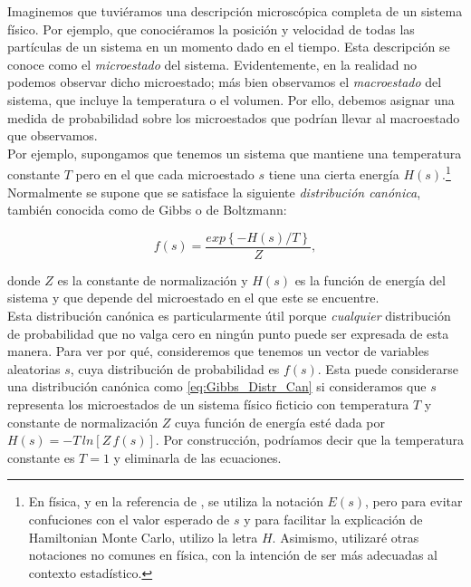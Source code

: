  Imaginemos que tuviéramos una descripción microscópica completa de un sistema físico. Por ejemplo, que conociéramos la posición y velocidad de todas las partículas de un sistema en un momento dado en el tiempo. Esta descripción se conoce como el \textit{microestado} del sistema. Evidentemente, en la realidad no podemos observar dicho microestado; más bien observamos el \textit{macroestado} del sistema, que incluye la temperatura o el volumen. Por ello, debemos asignar una medida de probabilidad sobre los microestados que podrían llevar al macroestado que observamos.\\ 
 
 Por ejemplo, supongamos que tenemos un sistema que mantiene una temperatura constante $T$ pero en el que cada microestado $s$ tiene una cierta energía $H(s)$.\footnote{En física, y en la referencia de \textcite{Neal93}, se utiliza la notación $E(s)$, pero para evitar confuciones con el valor esperado de $s$ y para facilitar la explicación de Hamiltonian Monte Carlo, utilizo la letra $H$. Asimismo, utilizaré otras notaciones no comunes en física, con la intención de ser más adecuadas al contexto estadístico.} Normalmente se supone que se satisface la siguiente \textit{distribución canónica}, también conocida como de Gibbs o de Boltzmann: 
 
\begin{equation}
\label{eq:Gibbs_Distr_Can}
 f(s) = \dfrac{exp\left\lbrace-H(s)/T\right\rbrace}{Z},
\end{equation}
 
 donde $Z$ es la constante de normalización y $H(s)$ es la función de energía del sistema y que depende del microestado en el que este se encuentre.\\
 
 Esta distribución canónica es particularmente útil porque \textit{cualquier} distribución de probabilidad que no valga cero en ningún punto puede ser expresada de esta manera. Para ver por qué, consideremos que tenemos un vector de variables aleatorias $s$, cuya distribución de probabilidad es $f(s)$. Esta puede considerarse una distribución canónica como \eqref{eq:Gibbs_Distr_Can} si consideramos que $s$ representa los microestados de un sistema físico ficticio con temperatura $T$ y constante de normalización $Z$ cuya función de energía esté dada por $H(s) = -T\,ln\left[Z\,f(s)\right]$. Por construcción, podríamos decir que la temperatura constante es $T=1$ y eliminarla de las ecuaciones.\\ 
 
